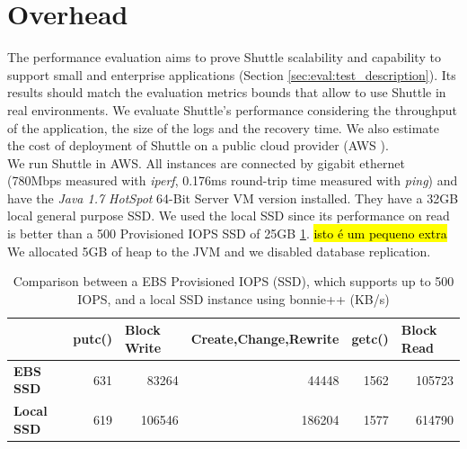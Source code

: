 \section{Overhead}\label{sec:eval:peformance}

The performance evaluation aims to prove Shuttle scalability and capability to support small and enterprise applications (Section \ref{sec:eval:test_description}). Its results should match the evaluation metrics bounds that allow to use Shuttle in real environments. We evaluate Shuttle's performance considering the throughput of the application, the size of the logs and the recovery time. We also estimate the cost of deployment of Shuttle on a public cloud provider (AWS \cite{aws}). \\

We run Shuttle in \acf{AWS}. All instances are connected by gigabit ethernet (780Mbps measured with \emph{iperf}, 0.176ms round-trip time measured with \emph{ping}) and have the \emph{Java 1.7 HotSpot} 64-Bit Server \ac{VM} version installed. They have a 32GB local general purpose \ac{SSD}. We used the local \ac{SSD} since its performance on read is better than a 500 Provisioned \ac{IOPS} \ac{SSD} of 25GB \ref{tab:disk_throughput}. \hl{isto é um pequeno extra} We allocated 5GB of heap to the \ac{JVM} and we disabled database replication. 

\begin{table}[ht]
\centering
\begin{tabular}{l|rrrrr}
                   & \multicolumn{1}{l}{\textbf{putc()}} & \multicolumn{1}{l}{\textbf{Block Write}} & \multicolumn{1}{l}{\textbf{Create,Change,Rewrite}} & \multicolumn{1}{l}{\textbf{getc()}} & \multicolumn{1}{l}{\textbf{Block Read}}  \\ \hline
\textbf{EBS SSD}      & 631                                 & 83264                                    & 44448                                              & 1562                                & 105723                                  \\
\textbf{Local SSD} & 619                                 & 106546                                   & 186204                                             & 1577                                & 614790                                 
\end{tabular}
\caption[Comparison between a EBS Provisioned IOPS (SSD) and local SSD instance]{Comparison between a EBS Provisioned IOPS (SSD), which supports up to 500 IOPS, and a local SSD instance using bonnie++ (KB/s)}
\label{tab:disk_throughput}
\end{table}




